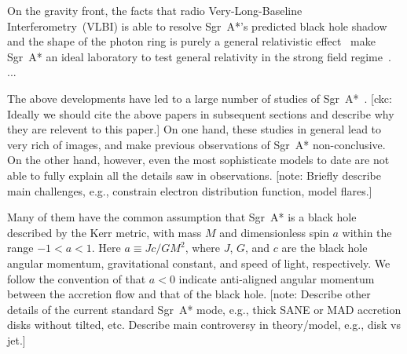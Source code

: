 \documentclass[twocolumn,tighten,dvipsnames]{aastex63}
\newcommand\sgra{Sgr~A*\xspace}
\newcommand\mbh{{M}} %
\newcommand\abh{{a}} %
\newcommand\<{{\langle}}
\renewcommand\>{{\rangle}} %
\newcommand\note[1]{{\color{OliveGreen}[note: #1]}}
\newcommand\ckc[1]{{\color{MidnightBlue}[ckc: #1]}}
\begin{document}
On the gravity front, the facts that radio Very-Long-Baseline
Interferometry~(VLBI) is able to resolve \sgra's predicted black hole
shadow~\citep{2000ApJ...528L..13F} and the shape of the photon ring is
purely a general relativistic effect~\citep{2010ApJ...718..446J} make
\sgra an ideal laboratory to test general relativity in the strong
field regime~\citep{2010ApJ...718..446J, 2014ApJ...784....7B,
  2015ApJ...802...63B, 2015ApJ...814..115P, 2016ApJ...818..121P,
  2016PhRvL.117i1101J, 2019GReGr..51..137P}.
...

The above developments have led to a large number of studies of
\sgra~\citep[e.g.,][]{2006MNRAS.370..219M, 2007MNRAS.379.1519M,
  2009A&A...508L..13M, 2009ApJ...698..676D, 2009ApJ...701..521C,
  2009ApJ...706..497M, 2012ApJ...746L..10D, 2012MNRAS.421.1315Z,
  2013A&A...559L...3M, 2014A&A...570A...7M, 2014ApJ...790....1B,
  2015A&A...576A..41B, 2015ApJ...799....1C, 2015ApJ...802...69B,
  2015ApJ...812..103C, 2015Sci...350.1242J, 2016A&A...588A..57F,
  2016ApJ...817..173L, 2016ApJ...824...40O, 2016ApJ...826...77B,
  2016ApJ...831....4P, 2016MNRAS.455.2187M, 2017ApJ...837..180G,
  2017ApJ...844...35M, 2017ApJ...851..148M, 2017MNRAS.467.3604R,
  2018A&A...612A..34D, 2018ApJ...856..163M, 2018ApJ...859...60L,
  2018ApJ...863..148P, 2018ApJ...865..104J, 2018ApJ...868..101B,
  2018JCAP...07..015H, 2018MNRAS.478.1875J, 2018MNRAS.478.5209C,
  2019ApJ...881L...2B, 2019ApJ...884..148B, 2019ApJ...886...96H,
  2020ApJ...896L...6R, 2020ApJ...897...99T, 2020MNRAS.492.3272R,
  2020MNRAS.493.1404A, 2020MNRAS.494.4168D, 2020MNRAS.494.5923P,
  2020arXiv200514251B, 2020arXiv200603657D, 2020arXiv200603658P}.
\ckc{Ideally we should cite the above papers in subsequent sections
  and describe why they are relevent to this paper.}
On one hand, these studies in general lead to very rich of images, and
make previous observations of \sgra non-conclusive.
On the other hand, however, even the most sophisticate models to date
are not able to fully explain all the details saw in observations.
\note{Briefly describe main challenges, e.g., constrain electron
  distribution function, model flares.}

Many of them have the common assumption that \sgra is a black hole
described by the Kerr metric, with mass $\mbh$ and dimensionless spin
$\abh$ within the range $-1 < \abh < 1$.
Here $\abh \equiv Jc/G\mbh^2$, where $J$, $G$, and $c$ are the black
hole angular momentum, gravitational constant, and speed of light,
respectively.
We follow the convention of  that
$\abh < 0$ indicate anti-aligned angular momentum between the
accretion flow and that of the black hole.
\note{Describe other details of the current standard \sgra mode, e.g.,
  thick SANE or MAD accretion disks without tilted, etc.
  Describe main controversy in theory/model, e.g., disk vs jet.}
\end{document}
